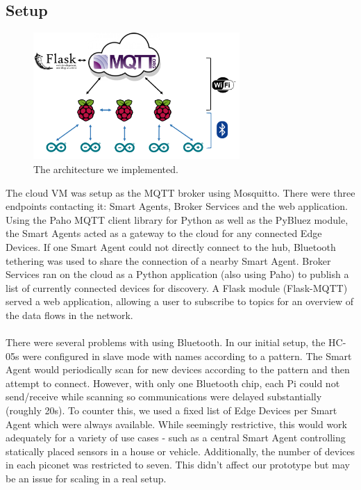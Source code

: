 \subsection{Setup}

\begin{figure}
    \centering
    \includegraphics[width=0.7\textwidth]{Architecture.png}
    \caption{The architecture we implemented.}
    \label{fig:architecture}
\end{figure}

The cloud VM was setup as the MQTT broker using Mosquitto. There were three endpoints contacting it: Smart Agents, Broker Services and the web application. Using the Paho MQTT client library for Python as well as the PyBluez module, the Smart Agents acted as a gateway to the cloud for any connected Edge Devices. If one Smart Agent could not directly connect to the hub, Bluetooth tethering was used to share the connection of a nearby Smart Agent. Broker Services ran on the cloud as a Python application (also using Paho) to publish a list of currently connected devices for discovery. A Flask module (Flask-MQTT) served a web application, allowing a user to subscribe to topics for an overview of the data flows in the network.

\paragraph{}
There were several problems with using Bluetooth. In our initial setup, the HC-05s were configured in slave mode with names according to a pattern. The Smart Agent would periodically scan for new devices according to the pattern and then attempt to connect. However, with only one Bluetooth chip, each Pi could not send/receive while scanning so communications were delayed substantially (roughly 20s). To counter this, we used a fixed list of Edge Devices per Smart Agent which were always available. While seemingly restrictive, this would work adequately for a variety of use cases - such as a central Smart Agent controlling statically placed sensors in a house or vehicle. Additionally, the number of devices in each piconet was restricted to seven. This didn't affect our prototype but may be an issue for scaling in a real setup.

